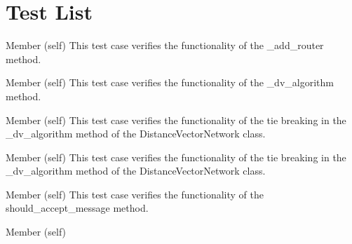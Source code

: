 \chapter{Test List}
\hypertarget{test}{}\label{test}

\begin{DoxyRefList}
\item[Member \doxylink{classtest__dvr_1_1_test_distance_vector_network_ac063b0552c86373776006054b428f2c0}{test\+\_\+dvr.Test\+Distance\+Vector\+Network.test\+\_\+add\+\_\+router} (self)]\label{test__test000003}%
%
This test case verifies the functionality of the \+\_\+add\+\_\+router method.  
\item[Member \doxylink{classtest__dvr_1_1_test_distance_vector_network_a9bc9c11716a1f59c7487e116ad134d07}{test\+\_\+dvr.Test\+Distance\+Vector\+Network.test\+\_\+dv\+\_\+algorithm} (self)]\label{test__test000004}%
%
This test case verifies the functionality of the \+\_\+dv\+\_\+algorithm method.  
\item[Member \doxylink{classtest__dvr_1_1_test_distance_vector_network_a52a2a293b1f425a7e33ac7174bfef9d9}{test\+\_\+dvr.Test\+Distance\+Vector\+Network.test\+\_\+tie\+\_\+break} (self)]\label{test__test000005}%
%
This test case verifies the functionality of the tie breaking in the \+\_\+dv\+\_\+algorithm method of the Distance\+Vector\+Network class.  
\item[Member \doxylink{classtest__dvr_1_1_test_distance_vector_network_a90fe4d64c95d2944792f0965d77ea02b}{test\+\_\+dvr.Test\+Distance\+Vector\+Network.test\+\_\+tie\+\_\+break\+\_\+after\+\_\+change} (self)]\label{test__test000006}%
%
This test case verifies the functionality of the tie breaking in the \+\_\+dv\+\_\+algorithm method of the Distance\+Vector\+Network class.  
\item[Member \doxylink{classtest__dvr_1_1_test_distance_vector_router_af0bbb563504d7504bf9af54594f4571a}{test\+\_\+dvr.Test\+Distance\+Vector\+Router.test\+\_\+should\+\_\+accept\+\_\+message} (self)]\label{test__test000002}%
%
This test case verifies the functionality of the should\+\_\+accept\+\_\+message method.  
\item[Member \doxylink{classtest__dvr_1_1_test_distance_vector_router_ad7af008506b99eedc9997308222921b8}{test\+\_\+dvr.Test\+Distance\+Vector\+Router.test\+\_\+update\+\_\+routing\+\_\+table} (self)]\label{test__test000001}%

\end{DoxyRefList}
